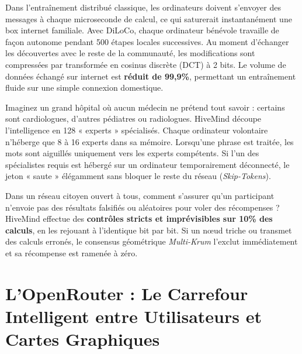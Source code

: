 \documentclass[11pt,a4paper]{article}
\begin{document}
\begin{tcolorbox}[title=2. L'Optimisation DiLoCo et Compression DCT 2-Bits (Diviser le Trafic par 1000)]
Dans l'entraînement distribué classique, les ordinateurs doivent s'envoyer des messages à chaque microseconde de calcul, ce qui saturerait instantanément une box internet familiale. Avec DiLoCo, chaque ordinateur bénévole travaille de façon autonome pendant 500 étapes locales successives. Au moment d'échanger les découvertes avec le reste de la communauté, les modifications sont compressées par transformée en cosinus discrète (DCT) à 2 bits. Le volume de données échangé sur internet est \textbf{réduit de 99,9\%}, permettant un entraînement fluide sur une simple connexion domestique.
\end{tcolorbox}

\begin{tcolorbox}[title=3. L'Architecture FoMoE : Des Experts Spécialisés et des Jetons-Sautants]
Imaginez un grand hôpital où aucun médecin ne prétend tout savoir : certains sont cardiologues, d'autres pédiatres ou radiologues. HiveMind découpe l'intelligence en 128 « experts » spécialisés. Chaque ordinateur volontaire n'héberge que 8 à 16 experts dans sa mémoire. Lorsqu'une phrase est traitée, les mots sont aiguillés uniquement vers les experts compétents. Si l'un des spécialistes requis est hébergé sur un ordinateur temporairement déconnecté, le jeton « saute » élégamment sans bloquer le reste du réseau (\emph{Skip-Tokens}).
\end{tcolorbox}

\begin{tcolorbox}[title=4. Sécurité Zéro-Confiance (Zero-Trust) \& Détection des Tricheurs]
Dans un réseau citoyen ouvert à tous, comment s'assurer qu'un participant n'envoie pas des résultats falsifiés ou aléatoires pour voler des récompenses ? HiveMind effectue des \textbf{contrôles stricts et imprévisibles sur 10\% des calculs}, en les rejouant à l'identique bit par bit. Si un nœud triche ou transmet des calculs erronés, le consensus géométrique \emph{Multi-Krum} l'exclut immédiatement et sa récompense est ramenée à zéro.
\end{tcolorbox}

\section{L'OpenRouter : Le Carrefour Intelligent entre Utilisateurs et Cartes Graphiques}
\end{document}

